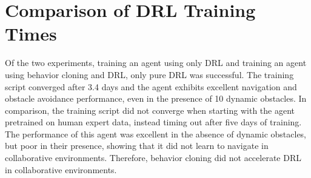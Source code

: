 \section{Comparison of DRL Training Times}
Of the two experiments, training an agent using only DRL and training an agent using behavior cloning and DRL, only pure DRL was successful. The training script converged after 3.4 days and the agent exhibits excellent navigation and obstacle avoidance performance, even in the presence of 10 dynamic obstacles. In comparison, the training script did not converge when starting with the agent pretrained on human expert data, instead timing out after five days of training. The performance of this agent was excellent in the absence of dynamic obstacles, but poor in their presence, showing that it did not learn to navigate in collaborative environments. Therefore, behavior cloning did not accelerate DRL in collaborative environments.

